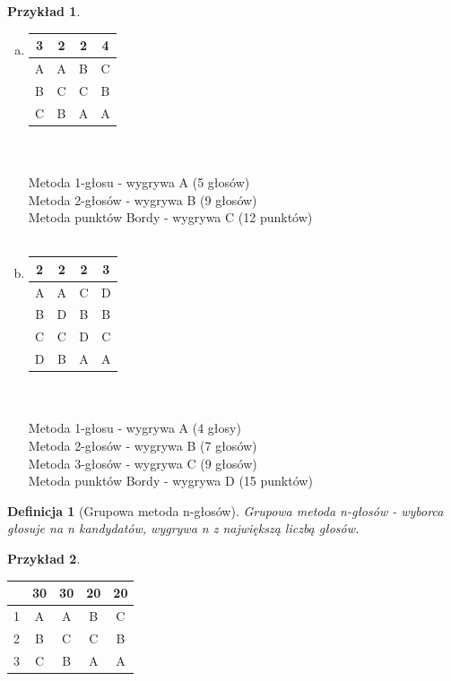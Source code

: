 \documentclass[12pt,a4paper]{article}
\theoremstyle{break}
\newtheorem{definition}{Definicja}[section]
\newtheorem{example}{Przykład}[section]
\begin{document}
	\begin{example} \end{example} \begin{enumerate}[a)]
	
	\item \begin{tabular}{|c|c|c|c|}\hline
		3&2&2&4\\\hline
		A&A&B&C\\\hline
		B&C&C&B\\\hline
		C&B&A&A\\\hline
	\end{tabular}\\\\

	Metoda 1-głosu - wygrywa A (5 głosów)\\
	Metoda 2-głosów - wygrywa B (9 głosów)\\
	Metoda punktów Bordy - wygrywa C (12 punktów)\\\\

	\item \begin{tabular}{|c|c|c|c|}\hline
		2&2&2&3\\\hline
		A&A&C&D\\\hline
		B&D&B&B\\\hline
		C&C&D&C\\\hline
		D&B&A&A\\\hline
	\end{tabular}\\\\

	Metoda 1-głosu - wygrywa A (4 głosy)\\
	Metoda 2-głosów - wygrywa B (7 głosów)\\
	Metoda 3-głosów - wygrywa C (9 głosów)\\
	Metoda punktów Bordy - wygrywa D (15 punktów)
	
	\end{enumerate} 
	
	
	\begin{definition}[Grupowa metoda n-głosów]
		Grupowa metoda n-głosów - wyborca głosuje na n kandydatów, wygrywa n z największą liczbą głosów.
	\end{definition}
	\newpage
	\begin{example}
		
	\end{example}
	
	\begin{tabular}{|c|c|c|c|c|}\hline
		&30&30&20&20\\\hline
		1&A&A&B&C\\\hline
		2&B&C&C&B\\\hline
		3&C&B&A&A\\\hline
	\end{tabular}\\\\
\end{document}
